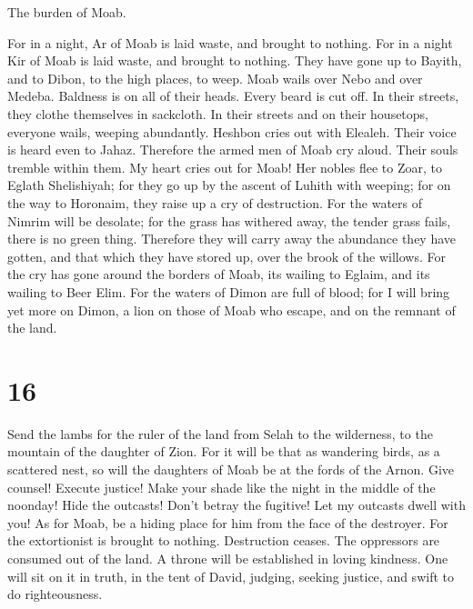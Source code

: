  The burden of Moab.

For in a night, Ar of Moab is laid waste, and brought to nothing. For in
a night Kir of Moab is laid waste, and brought to nothing.
 They have gone up to Bayith, and to Dibon, to the high
places, to weep. Moab wails over Nebo and over Medeba. Baldness is on
all of their heads. Every beard is cut off.  In their
streets, they clothe themselves in sackcloth. In their streets and on
their housetops, everyone wails, weeping abundantly. 
Heshbon cries out with Elealeh. Their voice is heard even to Jahaz.
Therefore the armed men of Moab cry aloud. Their souls tremble within
them.  My heart cries out for Moab! Her nobles flee to
Zoar, to Eglath Shelishiyah; for they go up by the ascent of Luhith with
weeping; for on the way to Horonaim, they raise up a cry of destruction.
 For the waters of Nimrim will be desolate; for the grass
has withered away, the tender grass fails, there is no green thing.
 Therefore they will carry away the abundance they have
gotten, and that which they have stored up, over the brook of the
willows.  For the cry has gone around the borders of Moab,
its wailing to Eglaim, and its wailing to Beer Elim.  For
the waters of Dimon are full of blood; for I will bring yet more on
Dimon, a lion on those of Moab who escape, and on the remnant of the
land.

\hypertarget{section-15}{%
\section{16}\label{section-15}}

 Send the lambs for the ruler of the land from Selah to
the wilderness, to the mountain of the daughter of Zion. 
For it will be that as wandering birds, as a scattered nest, so will the
daughters of Moab be at the fords of the Arnon.  Give
counsel! Execute justice! Make your shade like the night in the middle
of the noonday! Hide the outcasts! Don't betray the fugitive!
 Let my outcasts dwell with you! As for Moab, be a hiding
place for him from the face of the destroyer. For the extortionist is
brought to nothing. Destruction ceases. The oppressors are consumed out
of the land.  A throne will be established in loving
kindness. One will sit on it in truth, in the tent of David, judging,
seeking justice, and swift to do righteousness.

